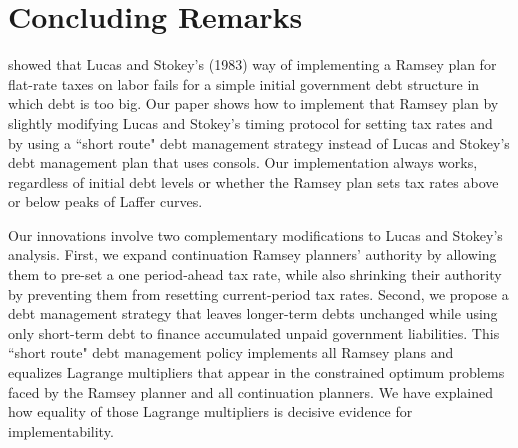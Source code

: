 \documentclass[12pt]{article}
\newcommand{\WJ}[1]{{\textcolor{red}{#1}}}
\begin{document}
%
%	



\section{Concluding Remarks\label{sec:conclusion}}

 {\cite{debortoli2021optimal} showed that Lucas and Stokey's (1983) way of implementing a Ramsey plan for flat-rate taxes on labor   fails for a simple initial government debt structure in which debt is too big. Our paper shows how to implement that Ramsey plan by slightly modifying   Lucas and Stokey's  timing protocol for setting tax rates and by using a ``short route" debt management strategy instead of Lucas and Stokey's debt management plan that uses consols.
 Our implementation  always works, regardless of initial debt levels or whether  the Ramsey plan sets  tax rates above or below  peaks of  Laffer curves.} 


Our  innovations involve two complementary modifications to Lucas and Stokey's analysis. First, we expand    continuation Ramsey planners' authority by allowing them to pre-set a one period-ahead tax rate, while also shrinking their authority by  preventing them  from resetting current-period tax rates. Second, we propose a debt management strategy that leaves longer-term debts unchanged while using only short-term debt  to finance accumulated unpaid government liabilities. This ``short route" debt management policy implements all Ramsey plans and equalizes  Lagrange multipliers that appear in  the constrained optimum problems faced by the  Ramsey planner and all continuation planners. We have explained how equality  of those Lagrange multipliers is decisive evidence for implementability. %
\end{document}
